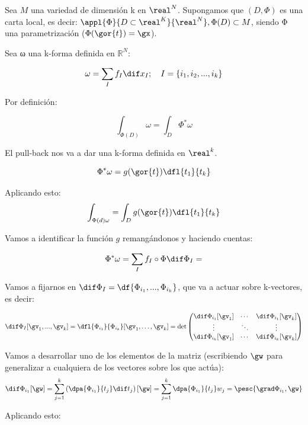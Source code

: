 Sea $M$ una variedad de dimensión k en $\real^N$. Supongamos que $(D,\Phi)$ es una carta local, es decir:
$\appl{\Phi}{D\subset\real^K}{\real^N}, \Phi(D)\subset M$, siendo Φ una parametrización ($\Phi(\gor{t}) = \gx$).

Sea ω una k-forma definida en $ℝ^N$:

\[\omega = \sum_I f_I\dif x_I; \quad I=\{i_1,i_2,...,i_k\}\]

Por definición:

\begin{equation}
\int_{\Phi(D)} \omega = \int_D \Phi^{\ast}\omega \label{eqIntFDifVar}
\end{equation}

El pull-back nos va a dar una k-forma definida en $\real^k$.

\[
\Phi^{\ast}\omega =g(\gor{t})\dfl{t_1}{t_k}
\]

Aplicando esto:
\[
\int_{\Phi(d) \omega} = \int_D g(\gor{t})\dfl{t_1}{t_k}
\]

Vamos a identificar la función $g$ remangándonos y haciendo cuentas:

\[
\Phi^{\ast} \omega = \sum_I f_I\circ\Phi \dif \Phi_I =
\]

Vamos a fijarnos en $\dif \Phi_I = \df{\Phi_{i_1},...,\Phi_{i_k}}$, que va a actuar sobre k-vectores, es decir:

\[
\dif \Phi_I[\gv_1,...,\gv_k] = \dfl{\Phi_{i_1}}{\Phi_{i_k}} [\gv_1,\dotsc,\gv_k]
= \det \begin{pmatrix}
	\dif \Phi_{i_1}[\gv_1] 	& \cdots & \dif \Phi_{i_1}[\gv_k] \\
	\vdots 					& \ddots & \vdots\\
	\dif \Phi_{i_k}[\gv_1] 	& \cdots & \dif \Phi_{i_k}[\gv_k] \\
\end{pmatrix}
\]

Vamos a desarrollar uno de los elementos de la matriz (escribiendo $\gw$ para generalizar a cualquiera de los vectores sobre los que actúa):
\[
\dif \Phi_{i_1}[\gw] = \sum_{j=1}^k \left(\dpa{\Phi_{i_1}}{t_j} \dif t_j\right)[\gw] = \sum_{j=1}^k \dpa{\Phi_{i_1}}{t_j}w_j = \pesc{\grad \Phi_{i_1},\gw}
\]

Aplicando esto:

